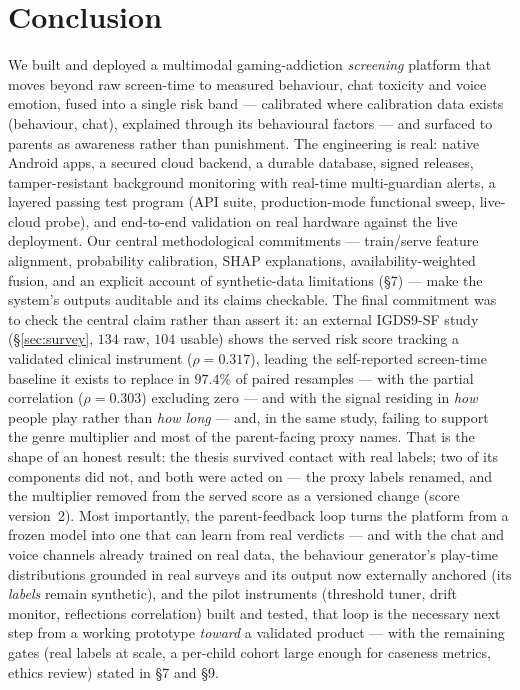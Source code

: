 \documentclass[11pt,a4paper]{article}
\begin{document}
\section{Conclusion}
We built and deployed a multimodal gaming-addiction \emph{screening} platform that
moves beyond raw screen-time to measured behaviour, chat toxicity and voice emotion,
fused into a single risk band --- calibrated where calibration data exists
(behaviour, chat), explained through its behavioural factors --- and surfaced to
parents as awareness rather than punishment. The engineering is real: native Android apps, a secured cloud
backend, a durable database, signed releases, tamper-resistant background monitoring with
real-time multi-guardian alerts, a layered passing test program (API suite,
production-mode functional sweep, live-cloud probe), and end-to-end validation on real
hardware against the live deployment. Our central
methodological commitments --- train/serve feature alignment, probability
calibration, SHAP explanations, availability-weighted fusion, and an explicit account
of synthetic-data limitations (\S7) --- make the system's outputs auditable and its
claims checkable. The final commitment was to check the central claim rather than
assert it: an external IGDS9-SF study (\S\ref{sec:survey}, $134$ raw, $104$
usable) shows the served risk score tracking a validated clinical instrument
($\rho = 0.317$), leading the self-reported screen-time baseline it exists to
replace in $97.4\%$ of paired resamples --- with the partial correlation
($\rho = 0.303$) excluding zero --- and with the signal residing
in \emph{how} people play rather than \emph{how long} --- and, in the same
study, failing to support the genre multiplier and most of the parent-facing
proxy names. That is the shape of an honest result: the thesis survived
contact with real labels; two of its components did not, and both were acted
on --- the proxy labels renamed, and the multiplier removed from the served
score as a versioned change (score version~2).
Most importantly, the parent-feedback loop turns the platform from a
frozen model into one that can learn from real verdicts --- and with the chat and
voice channels already trained on real data, the behaviour generator's play-time
distributions grounded in real surveys and its output now externally anchored
(its \emph{labels} remain synthetic), and the pilot instruments (threshold tuner,
drift monitor, reflections correlation) built and tested, that loop is the
necessary next step from a working prototype \emph{toward} a validated product
--- with the remaining gates (real labels at scale, a per-child cohort large
enough for caseness metrics, ethics review) stated in \S7 and \S9.
\end{document}
